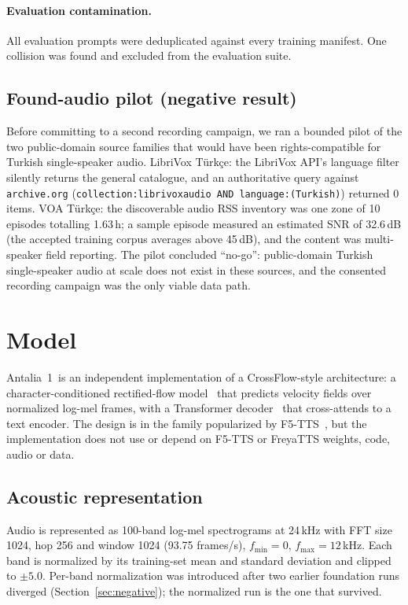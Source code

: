 \documentclass[10pt,twocolumn]{article}
\newcommand{\antalia}{Antalia~1}
\newcommand{\code}[1]{\texttt{#1}}
\begin{document}
\paragraph{Evaluation contamination.} All evaluation prompts were deduplicated against every training manifest. One collision was found and excluded from the evaluation suite.

\subsection{Found-audio pilot (negative result)}
\label{sec:found-audio}

Before committing to a second recording campaign, we ran a bounded pilot of the two public-domain source families that would have been rights-compatible for Turkish single-speaker audio. LibriVox Türkçe: the LibriVox API's language filter silently returns the general catalogue, and an authoritative query against \code{archive.org} (\code{collection:librivoxaudio AND language:(Turkish)}) returned 0 items. VOA Türkçe: the discoverable audio RSS inventory was one zone of 10 episodes totalling 1.63\,h; a sample episode measured an estimated SNR of 32.6\,dB (the accepted training corpus averages above 45\,dB), and the content was multi-speaker field reporting. The pilot concluded ``no-go'': public-domain Turkish single-speaker audio at scale does not exist in these sources, and the consented recording campaign was the only viable data path.

\section{Model}
\label{sec:model}

\antalia\ is an independent implementation of a CrossFlow-style architecture: a character-conditioned rectified-flow model~\citep{lipman2023flow,liu2023rectified} that predicts velocity fields over normalized log-mel frames, with a Transformer decoder~\citep{vaswani2017attention} that cross-attends to a text encoder. The design is in the family popularized by F5-TTS~\citep{chen2024f5tts}, but the implementation does not use or depend on F5-TTS or FreyaTTS weights, code, audio or data.

\subsection{Acoustic representation}

Audio is represented as 100-band log-mel spectrograms at 24\,kHz with FFT size 1024, hop 256 and window 1024 (93.75 frames/s), $f_{\min}=0$, $f_{\max}=12$\,kHz. Each band is normalized by its training-set mean and standard deviation and clipped to $\pm 5.0$. Per-band normalization was introduced after two earlier foundation runs diverged (Section~\ref{sec:negative}); the normalized run is the one that survived.
\end{document}
